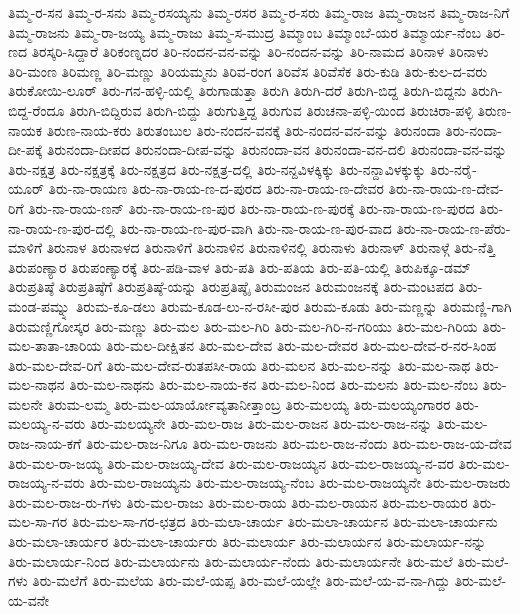 ತಿಮ್ಮ-ರ-ಸನ
ತಿಮ್ಮ-ರ-ಸನು
ತಿಮ್ಮ-ರಸಯ್ಯನು
ತಿಮ್ಮ-ರಸರ
ತಿಮ್ಮ-ರ-ಸರು
ತಿಮ್ಮ-ರಾಜ
ತಿಮ್ಮ-ರಾಜನ
ತಿಮ್ಮ-ರಾಜ-ನಿಗೆ
ತಿಮ್ಮ-ರಾಜನು
ತಿಮ್ಮ-ರಾ-ಜಯ್ಯ
ತಿಮ್ಮ-ರಾಜು
ತಿಮ್ಮ-ಸ-ಮುದ್ರ
ತಿಮ್ಮಾಂಬ
ತಿಮ್ಮಾಂಬೆ-ಯರ
ತಿಮ್ಮಾರ್ಯ-ನೆಂಬ
ತಿರ-ಣದ
ತಿರಸ್ಕರಿ-ಸಿದ್ದಾರೆ
ತಿರಿಕಂಣ್ನದರ
ತಿರಿ-ನಂದನ-ವನ-ವನ್ನು
ತಿರಿ-ನಂದನ-ವನ್ನು
ತಿರಿ-ನಾಮದ
ತಿರಿನಾಳ
ತಿರಿನಾಳು
ತಿರಿ-ಮಂಣ
ತಿರಿಮಣ್ಣ
ತಿರಿ-ಮಣ್ಣು
ತಿರಿಯಮ್ಮನು
ತಿರಿವ-ರಂಗ
ತಿರಿವೆಸ
ತಿರಿವೆಸೆಕ
ತಿರು-ಕುಡಿ
ತಿರು-ಕುಲ-ದ-ವರು
ತಿರುಕೋಯಿ-ಲೂರ್
ತಿರು-ಗನ-ಹಳ್ಳಿ-ಯಲ್ಲಿ
ತಿರುಗಾಡುತ್ತಾ
ತಿರುಗಿ
ತಿರುಗಿ-ದರೆ
ತಿರುಗಿ-ಬಿದ್ದ
ತಿರುಗಿ-ಬಿದ್ದನು
ತಿರುಗಿ-ಬಿದ್ದ-ರೆಂದೂ
ತಿರುಗಿ-ಬಿದ್ದಿರುವ
ತಿರುಗಿ-ಬಿದ್ದು
ತಿರುಗುತ್ತಿದ್ದ
ತಿರುಗುವ
ತಿರುಚನಾ-ಪಳ್ಳಿ-ಯಿಂದ
ತಿರುಚಿರಾ-ಪಳ್ಳಿ
ತಿರುಣ-ನಾಯಕ
ತಿರುಣ-ನಾಯ-ಕರು
ತಿರುತಂಬುಲ
ತಿರು-ನಂದನ-ವನಕ್ಕೆ
ತಿರು-ನಂದನ-ವನ-ವನ್ನು
ತಿರುನಂದಾ
ತಿರು-ನಂದಾ-ದೀ-ಪಕ್ಕೆ
ತಿರುನಂದಾ-ದೀಪದ
ತಿರುನಂದಾ-ದೀಪ-ವನ್ನು
ತಿರುನಂದಾ-ವನ
ತಿರುನಂದಾ-ವನ-ದಲಿ
ತಿರುನಂದಾ-ವನ-ವನ್ನು
ತಿರು-ನಕ್ಷತ್ರ
ತಿರು-ನಕ್ಷತ್ರಕ್ಕೆ
ತಿರು-ನಕ್ಷತ್ರದ
ತಿರು-ನಕ್ಷತ್ರ-ದಲ್ಲಿ
ತಿರು-ನನ್ದವಿಳಕ್ಕಿಕ್ಕು
ತಿರು-ನನ್ದಾವಿಳಕ್ಕುಕ್ಕು
ತಿರು-ನರೈ-ಯೂರ್
ತಿರು-ನಾ-ರಾಯಣ
ತಿರು-ನಾ-ರಾಯ-ಣ-ದ-ಪುರದ
ತಿರು-ನಾ-ರಾಯ-ಣ-ದೇವರ
ತಿರು-ನಾ-ರಾಯ-ಣ-ದೇವ-ರಿಗೆ
ತಿರು-ನಾ-ರಾಯ-ಣನ್
ತಿರು-ನಾ-ರಾಯ-ಣ-ಪುರ
ತಿರು-ನಾ-ರಾಯ-ಣ-ಪುರಕ್ಕೆ
ತಿರು-ನಾ-ರಾಯ-ಣ-ಪುರದ
ತಿರು-ನಾ-ರಾಯ-ಣ-ಪುರ-ದಲ್ಲಿ
ತಿರು-ನಾ-ರಾಯ-ಣ-ಪುರ-ವಾಗಿ
ತಿರು-ನಾ-ರಾಯ-ಣ-ಪುರ-ವಾದ
ತಿರು-ನಾ-ರಾಯ-ಣ-ಪೆರು-ಮಾಳಿಗೆ
ತಿರುನಾಳ
ತಿರುನಾಳದ
ತಿರುನಾಳಿಗೆ
ತಿರುನಾಳಿನ
ತಿರುನಾಳಿನಲ್ಲಿ
ತಿರುನಾಳು
ತಿರುನಾಳ್
ತಿರುನಾಳ್ಗೆ
ತಿರು-ನೆತ್ತಿ
ತಿರುಪಂಣ್ಯಾರ
ತಿರುಪಂಣ್ಯಾರಕ್ಕೆ
ತಿರು-ಪಡಿ-ವಾಳ
ತಿರು-ಪತಿ
ತಿರು-ಪತಿಯ
ತಿರು-ಪತಿ-ಯಲ್ಲಿ
ತಿರುಪಿಕ್ಕೂ-ಡಮ್
ತಿರುಪ್ರತಿಷ್ಠೆ
ತಿರುಪ್ರತಿಷ್ಠೆಗೆ
ತಿರುಪ್ರತಿಷ್ಠೆ-ಯನ್ನು
ತಿರುಪ್ರತಿಷ್ಠೈ
ತಿರುಮಂಜನ
ತಿರುಮಂಜನಕ್ಕೆ
ತಿರು-ಮಂಟಪದ
ತಿರು-ಮಂಡ-ಪಮ್ನ್ನು
ತಿರುಮ-ಕೂ-ಡಲು
ತಿರುಮ-ಕೂಡ-ಲು-ನ-ರಸೀ-ಪುರ
ತಿರುಮ-ಕೂಡು
ತಿರು-ಮಣ್ಣನ್ನು
ತಿರುಮಣ್ಣಿ-ಗಾಗಿ
ತಿರುಮಣ್ಣಿಗೋಸ್ಕರ
ತಿರು-ಮಣ್ಣು
ತಿರು-ಮಲ
ತಿರು-ಮಲ-ಗಿರಿ
ತಿರು-ಮಲ-ಗಿರಿ-ನ-ಗರಿಯು
ತಿರು-ಮಲ-ಗಿರಿಯ
ತಿರು-ಮಲ-ತಾತಾ-ಚಾರಿಯ
ತಿರು-ಮಲ-ದೀಕ್ಷಿತನ
ತಿರು-ಮಲ-ದೇವ
ತಿರು-ಮಲ-ದೇವರ
ತಿರು-ಮಲ-ದೇವ-ರ-ನರ-ಸಿಂಹ
ತಿರು-ಮಲ-ದೇವ-ರಿಗೆ
ತಿರು-ಮಲ-ದೇವ-ರುತಪಸೀ-ರಾಯ
ತಿರು-ಮಲನ
ತಿರು-ಮಲ-ನನ್ನು
ತಿರು-ಮಲ-ನಾಥ
ತಿರು-ಮಲ-ನಾಥನ
ತಿರು-ಮಲ-ನಾಥನು
ತಿರು-ಮಲ-ನಾಯ-ಕನ
ತಿರು-ಮಲ-ನಿಂದ
ತಿರು-ಮಲನು
ತಿರು-ಮಲ-ನೆಂಬ
ತಿರು-ಮಲನೇ
ತಿರುಮ-ಲಮ್ಮ
ತಿರು-ಮಲ-ಯಾರ್ಯೋವ್ಯತಾನೀತ್ತಾಂಬ್ರ
ತಿರು-ಮಲಯ್ಯ
ತಿರು-ಮಲಯ್ಯಂಗಾರರ
ತಿರು-ಮಲಯ್ಯ-ನ-ವರು
ತಿರು-ಮಲಯ್ಯನೇ
ತಿರು-ಮಲ-ರಾಜ
ತಿರು-ಮಲ-ರಾಜನ
ತಿರು-ಮಲ-ರಾಜ-ನನ್ನು
ತಿರು-ಮಲ-ರಾಜ-ನಾಯ-ಕಗೆ
ತಿರು-ಮಲ-ರಾಜ-ನಿಗೂ
ತಿರು-ಮಲ-ರಾಜನು
ತಿರು-ಮಲ-ರಾಜ-ನೆಂದು
ತಿರು-ಮಲ-ರಾಜ-ಯ-ದೇವ
ತಿರು-ಮಲ-ರಾ-ಜಯ್ಯ
ತಿರು-ಮಲ-ರಾಜಯ್ಯ-ದೇವ
ತಿರು-ಮಲ-ರಾಜಯ್ಯನ
ತಿರು-ಮಲ-ರಾಜಯ್ಯ-ನ-ವರ
ತಿರು-ಮಲ-ರಾಜಯ್ಯ-ನ-ವರು
ತಿರು-ಮಲ-ರಾಜಯ್ಯನು
ತಿರು-ಮಲ-ರಾಜಯ್ಯ-ನೆಂಬ
ತಿರು-ಮಲ-ರಾಜಯ್ಯನೇ
ತಿರು-ಮಲ-ರಾಜರು
ತಿರು-ಮಲ-ರಾಜ-ರು-ಗಳು
ತಿರು-ಮಲ-ರಾಜು
ತಿರು-ಮಲ-ರಾಯ
ತಿರು-ಮಲ-ರಾಯನ
ತಿರು-ಮಲ-ರಾಯರ
ತಿರು-ಮಲ-ಸಾ-ಗರ
ತಿರು-ಮಲ-ಸಾ-ಗರ-ಛತ್ರದ
ತಿರು-ಮಲಾ-ಚಾರ್ಯ
ತಿರು-ಮಲಾ-ಚಾರ್ಯನ
ತಿರು-ಮಲಾ-ಚಾರ್ಯನು
ತಿರು-ಮಲಾ-ಚಾರ್ಯರ
ತಿರು-ಮಲಾ-ಚಾರ್ಯರು
ತಿರು-ಮಲಾರ್ಯ
ತಿರು-ಮಲಾರ್ಯನ
ತಿರು-ಮಲಾರ್ಯ-ನನ್ನು
ತಿರು-ಮಲಾರ್ಯ-ನಿಂದ
ತಿರು-ಮಲಾರ್ಯನು
ತಿರು-ಮಲಾರ್ಯ-ನೆಂದು
ತಿರು-ಮಲಾರ್ಯನೇ
ತಿರು-ಮಲೆ
ತಿರು-ಮಲೆ-ಗಳು
ತಿರು-ಮಲೆಗೆ
ತಿರು-ಮಲೆಯ
ತಿರು-ಮಲೆ-ಯಪ್ಪ
ತಿರು-ಮಲೆ-ಯಲ್ಲೇ
ತಿರು-ಮಲೆ-ಯ-ವ-ನಾ-ಗಿದ್ದು
ತಿರು-ಮಲೆ-ಯ-ವನೇ
